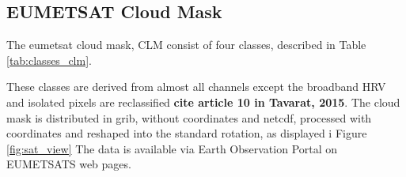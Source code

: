 \subsection{EUMETSAT Cloud Mask} \label{sec:EUMETSAT_cloud_mask}
The \acrshort{eumetsat} cloud mask, CLM consist of four classes, described in Table \ref{tab:classes_clm}.


These classes are derived from almost all channels except the broadband HRV and isolated pixels are reclassified \textbf{cite article 10 in Tavarat, 2015}. The cloud mask is distributed in \acrfull{grib},  without coordinates and \acrfull{netcdf}, processed with coordinates and reshaped into the standard rotation, as displayed i Figure \ref{fig:sat_view} The data is available via Earth Observation Portal on EUMETSATS web pages. 
